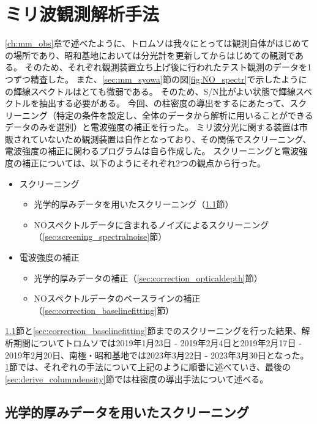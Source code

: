 \chapter{ミリ波観測解析手法}
\label{ch:mm_analysis}
\ref{ch:mm_obs}章で述べたように、トロムソは我々にとっては観測自体がはじめての場所であり、昭和基地においては分光計を更新してからはじめての観測である。
そのため、それぞれ観測装置立ち上げ後に行われたテスト観測のデータを1つずつ精査した。
また、\ref{sec:mm_syowa}節の図\ref{fig:NO_spectr}で示したようにの輝線スペクトルはとても微弱である。
そのため、S/N比がよい状態で輝線スペクトルを抽出する必要がある。
今回、の柱密度の導出をするにあたって、スクリーニング（特定の条件を設定し、全体のデータから解析に用いることができるデータのみを選別）と電波強度の補正を行った。
ミリ波分光に関する装置は市販されていないため観測装置は自作となっており、その関係でスクリーニング、電波強度の補正に関わるプログラムは自ら作成した。
スクリーニングと電波強度の補正については、以下のようにそれぞれ2つの観点から行った。
\begin{itemize}
    \item スクリーニング
    \begin{itemize}
        \item 光学的厚みデータを用いたスクリーニング（\ref{sec:screening_opticaldepth}節）
        \item NOスペクトルデータに含まれるノイズによるスクリーニング（\ref{sec:screening_spectralnoise}節）
    \end{itemize}
    \item 電波強度の補正
    \begin{itemize}
        \item 光学的厚みデータの補正（\ref{sec:correction_opticaldepth}節）
        \item NOスペクトルデータのベースラインの補正（\ref{sec:correction_baselinefitting}節）
    \end{itemize}
\end{itemize}
\ref{sec:screening_opticaldepth}節と\ref{sec:correction_baselinefitting}節までのスクリーニングを行った結果、解析期間についてトロムソでは2019年1月23日 - 2019年2月4日と2019年2月17日 - 2019年2月20日、南極・昭和基地では2023年3月22日 - 2023年3月30日となった。
\ref{ch:mm_analysis}節では、それぞれの手法について上記のように順番に述べていき、最後の\ref{sec:derive_columndensity}節では柱密度の導出手法について述べる。

\section{光学的厚みデータを用いたスクリーニング}
\label{sec:screening_opticaldepth}

